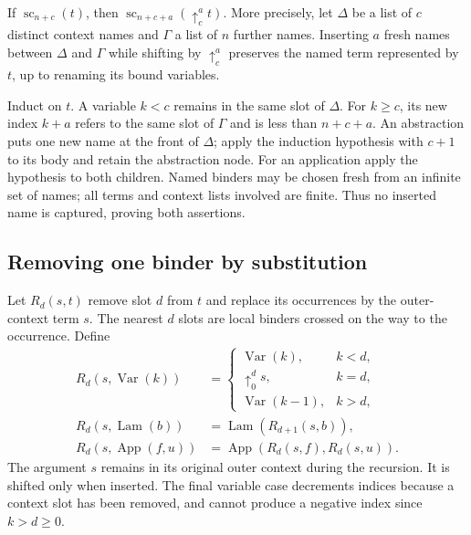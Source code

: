 \begin{lemma}
\label{lem:debruijn_shift_scope}
If $\operatorname{sc}_{n+c}(t)$, then
$\operatorname{sc}_{n+c+a}(\uparrow^a_c t)$.
More precisely, let $\Delta$ be a list of $c$ distinct context names
and $\Gamma$ a list of $n$ further names. Inserting $a$ fresh names
between $\Delta$ and $\Gamma$ while shifting by $\uparrow^a_c$
preserves the named term represented by $t$, up to renaming its bound
variables.
\end{lemma}
\Proof
Induct on $t$. A variable $k<c$ remains in the same slot of $\Delta$.
For $k\geq c$, its new index $k+a$ refers to the same slot of
$\Gamma$ and is less than $n+c+a$. An abstraction puts one new name
at the front of $\Delta$; apply the induction hypothesis with $c+1$
to its body and retain the abstraction node. For an application apply
the hypothesis to both children. Named binders may be chosen fresh
from an infinite set of names; all terms and context lists involved
are finite. Thus no inserted name is captured, proving both assertions.
\Done

\subsection{Removing one binder by substitution}
Let $R_d(s,t)$ remove slot $d$ from $t$ and replace its occurrences
by the outer-context term $s$. The nearest $d$ slots are local binders
crossed on the way to the occurrence. Define
\[
\begin{aligned}
R_d(s,\operatorname{Var}(k))
 &=\begin{cases}
   \operatorname{Var}(k),&k<d,\\
   \uparrow^d_0s,&k=d,\\
   \operatorname{Var}(k-1),&k>d,
   \end{cases}\\
R_d(s,\operatorname{Lam}(b))
 &=\operatorname{Lam}(R_{d+1}(s,b)),\\
R_d(s,\operatorname{App}(f,u))
 &=\operatorname{App}(R_d(s,f),R_d(s,u)).
\end{aligned}
\]
The argument $s$ remains in its original outer context during the
recursion. It is shifted only when inserted. The final variable case
decrements indices because a context slot has been removed, and
cannot produce a negative index since $k>d\geq0$.

